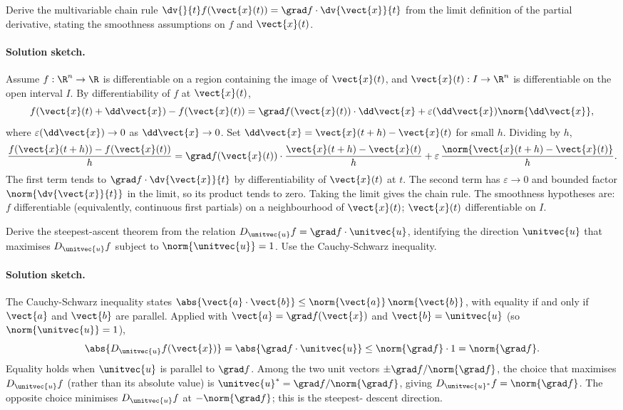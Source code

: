 \begin{exercise}
Derive the multivariable chain rule $\dv{}{t} f(\vect{x}(t)) =
\grad f \cdot \dv{\vect{x}}{t}$ from the limit definition of the
partial derivative, stating the smoothness assumptions on $f$ and
$\vect{x}(t)$.

\paragraph{Solution sketch.} Assume $f : \R^{n} \to \R$ is
differentiable on a region containing the image of $\vect{x}(t)$,
and $\vect{x}(t) : I \to \R^{n}$ is differentiable on the open
interval $I$. By differentiability of $f$ at $\vect{x}(t)$,
\[
f(\vect{x}(t) + \dd\vect{x}) - f(\vect{x}(t)) = \grad f(\vect{x}(t))
\cdot \dd\vect{x} + \varepsilon(\dd\vect{x})\norm{\dd\vect{x}},
\]
where $\varepsilon(\dd\vect{x}) \to 0$ as $\dd\vect{x} \to 0$. Set
$\dd\vect{x} = \vect{x}(t + h) - \vect{x}(t)$ for small $h$.
Dividing by $h$,
\[
\frac{f(\vect{x}(t + h)) - f(\vect{x}(t))}{h} = \grad f(\vect{x}(t))
\cdot \frac{\vect{x}(t + h) - \vect{x}(t)}{h} +
\varepsilon\,\frac{\norm{\vect{x}(t + h) - \vect{x}(t)}}{h}.
\]
The first term tends to $\grad f \cdot \dv{\vect{x}}{t}$ by
differentiability of $\vect{x}(t)$ at $t$. The second term has
$\varepsilon \to 0$ and bounded factor $\norm{\dv{\vect{x}}{t}}$ in
the limit, so its product tends to zero. Taking the limit gives
the chain rule. The smoothness hypotheses are: $f$ differentiable
(equivalently, continuous first partials) on a neighbourhood of
$\vect{x}(t)$; $\vect{x}(t)$ differentiable on $I$.
\end{exercise}

\begin{exercise}
Derive the steepest-ascent theorem from the relation $D_{\unitvec{u}}
f = \grad f \cdot \unitvec{u}$, identifying the direction
$\unitvec{u}$ that maximises $D_{\unitvec{u}} f$ subject to
$\norm{\unitvec{u}} = 1$. Use the Cauchy-Schwarz inequality.

\paragraph{Solution sketch.} The Cauchy-Schwarz inequality states
$\abs{\vect{a} \cdot \vect{b}} \leq \norm{\vect{a}}\,\norm{\vect{b}}$,
with equality if and only if $\vect{a}$ and $\vect{b}$ are
parallel. Applied with $\vect{a} = \grad f(\vect{x})$ and $\vect{b}
= \unitvec{u}$ (so $\norm{\unitvec{u}} = 1$),
\[
\abs{D_{\unitvec{u}} f(\vect{x})} = \abs{\grad f \cdot \unitvec{u}}
\leq \norm{\grad f} \cdot 1 = \norm{\grad f}.
\]
Equality holds when $\unitvec{u}$ is parallel to $\grad f$. Among
the two unit vectors $\pm \grad f / \norm{\grad f}$, the choice
that maximises $D_{\unitvec{u}} f$ (rather than its absolute value)
is $\unitvec{u}^{*} = \grad f / \norm{\grad f}$, giving $D_{
\unitvec{u}^{*}} f = \norm{\grad f}$. The opposite choice minimises
$D_{\unitvec{u}} f$ at $-\norm{\grad f}$; this is the steepest-
descent direction.
\end{exercise}

